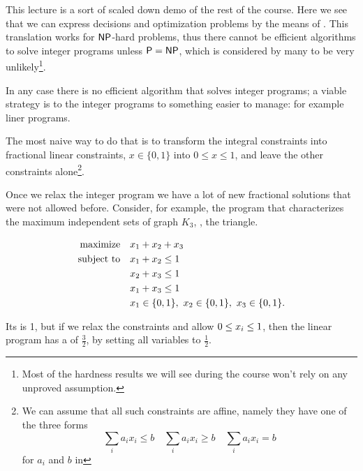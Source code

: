 \documentclass[a4paper,twoside,justified]{tufte-handout}
\begin{document}
 

This lecture is a sort of scaled down demo of the rest of the
course. Here we see that we can express decisions and optimization
problems by the means of . This
translation works for $ \mathsf{NP} $-hard problems, thus there cannot be
efficient algorithms to solve integer programs unless $\mathsf{P}=\mathsf{NP}$,
which is considered by many to be very unlikely\footnote{Most of the
  hardness results we will see during the course won't rely on any
  unproved assumption.}.

In any case there is no  efficient algorithm that
solves integer programs; a viable strategy is to 
the integer programs to something easier to manage: for example liner
programs.

The most naive way to do that is to transform the integral constraints
into fractional linear constraints, \eg $ x \in\{0,1\} $ into $ 0 \leq
x \leq 1 $, and leave the other constraints alone\footnote{We can
  assume that all such constraints are affine, namely they have one of
  the three forms
  \begin{equation*}
    \sum_{i}a_{i}x_{i} \leq b \quad   \sum_{i}a_{i}x_{i} \geq b \quad \sum_{i}a_{i}x_{i} = b
  \end{equation*}
  for $a_i$ and $ b $ in \RR}.

Once we relax the integer program we have a lot of new fractional
solutions that were not allowed before. Consider, for example,
the program that characterizes the maximum independent sets of graph $
K_{3} $, \ie, the triangle.

\begin{alignat}{2}
  \maximize x_{1} + x_{2} + x_{3} \notag\\
  \subjectto   x_{1} + x_{2} \leq 1 \notag\\
             & x_{2} + x_{3} \leq 1 \label{eq:triangle-ind-set}\\
             & x_{1} + x_{3} \leq 1 \notag\\
             & \varboolean{x_{1}},\ \varboolean{x_{2}},\ \varboolean{x_{3}}.\notag
\end{alignat}

Its  is 1, but if we relax the
constraints and allow $ \varbounded{x_{i}} $, then the linear program
has a  of $ \frac{3}{2} $, by
setting all variables to $\frac{1}{2}$.
\end{document}
